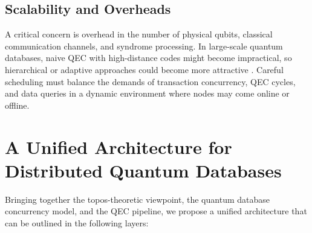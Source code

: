 \documentclass[11pt]{article}
\begin{document}
\subsection{Scalability and Overheads}
A critical concern is overhead in the number of physical qubits, classical communication channels, and syndrome processing. In large-scale quantum databases, naive QEC with high-distance codes might become impractical, so hierarchical or adaptive approaches could become more attractive \cite{lidar_brun}. Careful scheduling must balance the demands of transaction concurrency, QEC cycles, and data queries in a dynamic environment where nodes may come online or offline.

\section{A Unified Architecture for Distributed Quantum Databases}
\label{sec:unified_architecture}
Bringing together the topos-theoretic viewpoint, the quantum database concurrency model, and the QEC pipeline, we propose a unified architecture that can be outlined in the following layers:
\end{document}
